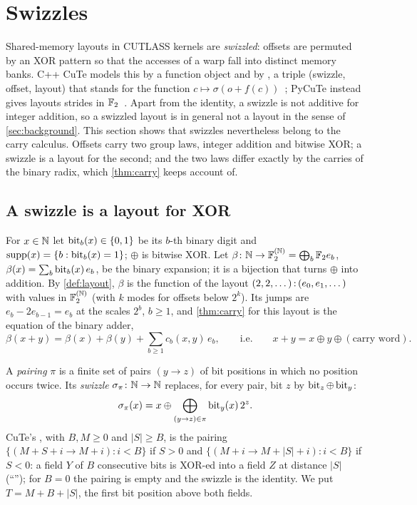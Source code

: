 \section{Swizzles}\label{sec:swizzle}

Shared-memory layouts in CUTLASS kernels are \emph{swizzled}: offsets are permuted by an XOR
pattern so that the accesses of a warp fall into distinct memory banks. C++ CuTe models this by a
function object  and by , a triple (swizzle, offset,
layout) that stands for the function $c\mapsto\sigma(o+f(c))$~\cite{cutedocs}; PyCuTe instead
gives layouts strides in $\mathbb{F}_2$~\cite{cecka2026,pycute}. Apart from the identity, a swizzle is not
additive for integer addition, so a swizzled layout is in general not a layout in the sense of
\cref{sec:background}. This section shows
that swizzles nevertheless belong to the carry calculus. Offsets carry two group laws, integer
addition and bitwise XOR; a swizzle is a layout for the second; and the two laws differ exactly
by the carries of the binary radix, which \cref{thm:carry} keeps account of.

\subsection{A swizzle is a layout for XOR}

For $x\in\mathbb{N}$ let $\operatorname{bit}_b(x)\in\{0,1\}$ be its $b$-th binary digit and
$\operatorname{supp}(x)=\{b:\operatorname{bit}_b(x)=1\}$; $\oplus$ is bitwise XOR. Let
$\beta\colon\mathbb{N}\to\mathbb{F}_2^{(\mathbb{N})}=\bigoplus_b\mathbb{F}_2e_b$, $\beta(x)=\sum_b\operatorname{bit}_b(x)\,e_b$, be the binary
expansion; it is a bijection that turns $\oplus$ into addition. By \cref{def:layout}, $\beta$ is
the function of the layout $(2,2,\dots)\,{:}\,(e_0,e_1,\dots)$ with values in $\mathbb{F}_2^{(\mathbb{N})}$
(with $k$ modes for offsets below $2^k$). Its jumps are $e_b-2e_{b-1}=e_b$ at the scales $2^b$,
$b\ge1$, and \cref{thm:carry} for this layout is the equation of the binary adder,
\begin{equation}\label{eq:adder}
 \beta(x+y)=\beta(x)+\beta(y)+\sum_{b\ge1}c_b(x,y)\,e_b,
 \qquad\text{i.e.}\qquad x+y=x\oplus y\oplus(\text{carry word}).
\end{equation}

\begin{definition}[swizzle]\label{def:swizzle}
A \emph{pairing} $\pi$ is a finite set of pairs $(y\to z)$ of bit positions in which no position
occurs twice. Its \emph{swizzle} $\sigma_\pi\colon\mathbb{N}\to\mathbb{N}$ replaces, for every pair, bit $z$ by
$\operatorname{bit}_z\oplus\operatorname{bit}_y$:
\[ \sigma_\pi(x)=x\oplus\bigoplus_{(y\to z)\in\pi}\operatorname{bit}_y(x)\,2^z . \]
CuTe's , with $B,M\ge0$ and $|S|\ge B$, is the pairing
$\{(M+S+i\to M+i):i<B\}$ if $S>0$ and $\{(M+i\to M+|S|+i):i<B\}$ if $S<0$: a field $Y$ of $B$
consecutive bits is XOR-ed into a field $Z$ at distance $|S|$ (``''); for $B=0$
the pairing is empty and the swizzle is the identity. We put $T=M+B+|S|$, the first bit position
above both fields.
\end{definition}


